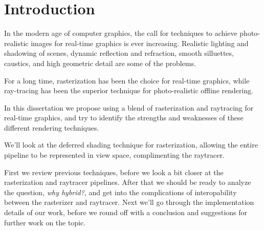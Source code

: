 
\part{Introduction}

In the modern age of computer graphics, the call for techniques to achieve photo-realistic images for real-time graphics is ever increasing. Realistic lighting and shadowing of scenes, dynamic reflection and refraction, smooth silluettes, caustics, and high geometric detail are some of the problems.

For a long time, rasterization has been the choice for real-time graphics, while ray-tracing has been the superior technique for photo-realistic offline rendering.

In this dissertation we propose using a blend of rasterization and raytracing for real-time graphics, and try to identify the strengths and weaknesses of these different rendering techniques.

We'll look at the deferred shading technique for rasterization, allowing the entire pipeline to be represented in view space, complimenting the raytracer.

First we review previous techniques, before we look a bit closer at the rasterization and raytracer pipelines. After that we should be ready to analyze the question, \emph{why hybrid?}, and get into the complications of interopability between the rasterizer and raytracer. Next we'll go through the implementation details of our work, before we round off with a conclusion and suggestions for further work on the topic.